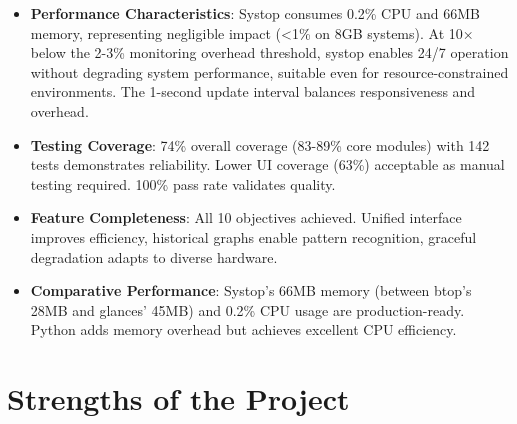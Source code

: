 \documentclass[12pt,a4paper,oneside]{report}
\begin{document}
\begin{itemize}
    \item \textbf{Performance Characteristics}: Systop consumes 0.2\% CPU and 66MB memory, representing negligible impact (<1\% on 8GB systems). At 10× below the 2-3\% monitoring overhead threshold, systop enables 24/7 operation without degrading system performance, suitable even for resource-constrained environments. The 1-second update interval balances responsiveness and overhead.
    
    \item \textbf{Testing Coverage}: 74\% overall coverage (83-89\% core modules) with 142 tests demonstrates reliability. Lower UI coverage (63\%) acceptable as manual testing required. 100\% pass rate validates quality.
    
    \item \textbf{Feature Completeness}: All 10 objectives achieved. Unified interface improves efficiency, historical graphs enable pattern recognition, graceful degradation adapts to diverse hardware.
    
    \item \textbf{Comparative Performance}: Systop's 66MB memory (between btop's 28MB and glances' 45MB) and 0.2\% CPU usage are production-ready. Python adds memory overhead but achieves excellent CPU efficiency.
\end{itemize}

\section{Strengths of the Project}
\label{sec:strengths}
\end{document}
